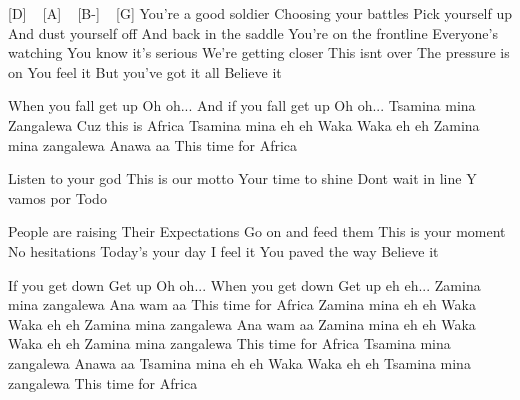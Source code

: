 [D] ~ [A] ~ [B-] ~ [G]
You're a good soldier
Choosing your battles
Pick yourself up
And dust yourself off
And back in the saddle
You're on the frontline
Everyone's watching
You know it's serious
We're getting closer
This isnt over
The pressure is on
You feel it
But you've got it all
Believe it

When you fall get up Oh oh...
And if you fall get up Oh oh...
Tsamina mina Zangalewa
Cuz this is Africa
Tsamina mina eh eh
Waka Waka eh eh
Zamina mina zangalewa Anawa aa
This time for Africa

Listen to your god
This is our motto
Your time to shine
Dont wait in line
Y vamos por Todo

People are raising
Their Expectations
Go on and feed them
This is your moment
No hesitations
Today's your day
I feel it
You paved the way
Believe it

If you get down Get up Oh oh...
When you get down Get up eh eh...
Zamina mina zangalewa Ana wam aa
This time for Africa
Zamina mina eh eh Waka Waka eh eh
Zamina mina zangalewa Ana wam aa
Zamina mina eh eh Waka Waka eh eh
Zamina mina zangalewa This time for Africa
Tsamina mina zangalewa Anawa aa
Tsamina mina eh eh Waka Waka eh eh
Tsamina mina zangalewa This time for Africa 